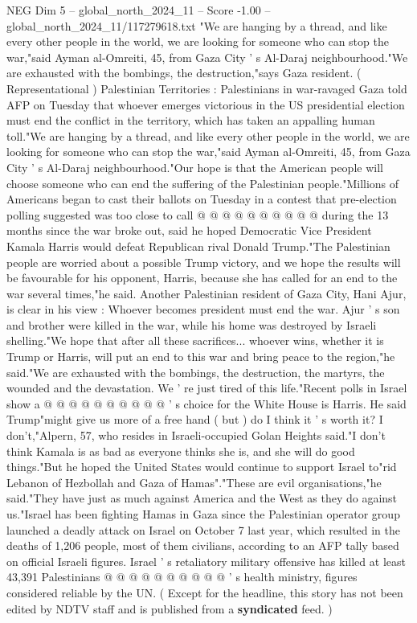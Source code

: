 \begin{textsample}{NEG Dim 5 – global\_north\_2024\_11 – Score -1.00 – global\_north\_2024\_11/117279618.txt}  \label{ex:f5_neg_412}
"We are hanging by a thread, and like every other people in the world, we are looking for someone who can stop the war,"said Ayman al-Omreiti, 45, from Gaza City ' s Al-Daraj neighbourhood."We are exhausted with the bombings, the destruction,"says Gaza resident. ( Representational ) Palestinian Territories : Palestinians in war-ravaged Gaza told AFP on Tuesday that whoever emerges victorious in the US presidential election must end the conflict in the territory, which has taken an appalling human toll."We are hanging by a thread, and like every other people in the world, we are looking for someone who can stop the war,"said Ayman al-Omreiti, 45, from Gaza City ' s Al-Daraj neighbourhood."Our hope is that the American people will choose someone who can end the suffering of the Palestinian people."Millions of Americans began to cast their ballots on Tuesday in a contest that pre-election polling suggested was too close to call @ @ @ @ @ @ @ @ @ @ during the 13 months since the war broke out, said he hoped Democratic Vice President Kamala Harris would defeat Republican rival Donald Trump."The Palestinian people are worried about a possible Trump victory, and we hope the results will be favourable for his opponent, Harris, because she has called for an end to the war several times,"he said.
Another Palestinian resident of Gaza City, Hani Ajur, is clear in his view : Whoever becomes president must end the war.
Ajur ' s son and brother were killed in the war, while his home was destroyed by Israeli shelling."We hope that after all these sacrifices... whoever wins, whether it is Trump or Harris, will put an end to this war and bring peace to the region,"he said."We are exhausted with the bombings, the destruction, the martyrs, the wounded and the devastation.
We ' re just tired of this life."Recent polls in Israel show a @ @ @ @ @ @ @ @ @ @ ' s choice for the White House is Harris.
He said Trump"might give us more of a free hand ( but ) do I think it ' s worth it?
I don't,"Alpern, 57, who resides in Israeli-occupied Golan Heights said."I don't think Kamala is as bad as everyone thinks she is, and she will do good things."But he hoped the United States would continue to support Israel to"rid Lebanon of Hezbollah and Gaza of Hamas"."These are evil organisations,"he said."They have just as much against America and the West as they do against us."Israel has been fighting Hamas in Gaza since the Palestinian operator group launched a deadly attack on Israel on October 7 last year, which resulted in the deaths of 1,206 people, most of them civilians, according to an AFP tally based on official Israeli figures.
Israel ' s retaliatory military offensive has killed at least 43,391 Palestinians @ @ @ @ @ @ @ @ @ @ ' s health ministry, figures considered reliable by the UN. ( Except for the headline, this story has not been edited by NDTV staff and is published from a \textbf{syndicated} feed. )

\end{textsample}

